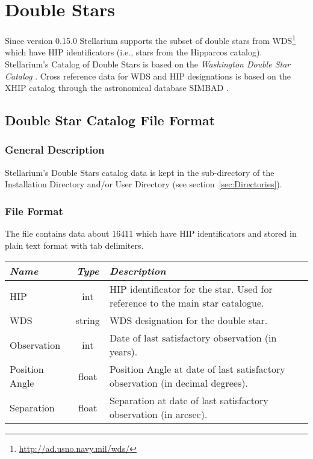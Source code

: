 \section{Double Stars}
\label{sec:StarCatalogues:DoubleStars}

Since version 0.15.0 Stellarium supports the subset of double stars
from WDS\footnote{\url{http://ad.usno.navy.mil/wds/}} which have HIP
identificators (i.e., stars from the Hipparcos catalog). Stellarium's Catalog
of Double Stars is based on the
\emph{Washington Double Star Catalog} \cite{2001AJ....122.3466M}. 
Cross reference data for WDS and HIP designations is based on the 
XHIP catalog \cite{2012AstL...38..331A} through the astronomical 
database SIMBAD  \cite{2000A&AS..143....9W}.

\subsection{Double Star Catalog File Format}
\label{sec:StarCatalogues:DoubleStars:format}

\subsubsection{General Description}
\label{sec:StarCatalogues:DoubleStars:general}

Stellarium's Double Stars catalog data is kept
in the  sub-directory of the Installation Directory and/or
User Directory (see section~\ref{sec:Directories}).


\subsubsection{File Format}
\label{sec:StarCatalogues:DoubleStars:file}

The  file contains data about 16411
 which have HIP identificators and
stored in plain text format with tab delimiters.

\begin{table}[htb]
\begin{tabularx}{\textwidth}{l|c|X}\toprule
\emph{Name} & \emph{Type} & \emph{Description}\\\midrule
HIP      		& int    & HIP identificator for the star. Used for reference to the main star catalogue.\\%
WDS      		& string & WDS designation for the double star.\\%
Observation		& int	 & Date of last satisfactory observation (in years).\\%
Position Angle  & float  & Position Angle at date of last satisfactory observation (in decimal degrees).\\%
Separation 		& float  & Separation at date of last satisfactory observation (in arcsec).\\\bottomrule
\end{tabularx}
\end{table}


